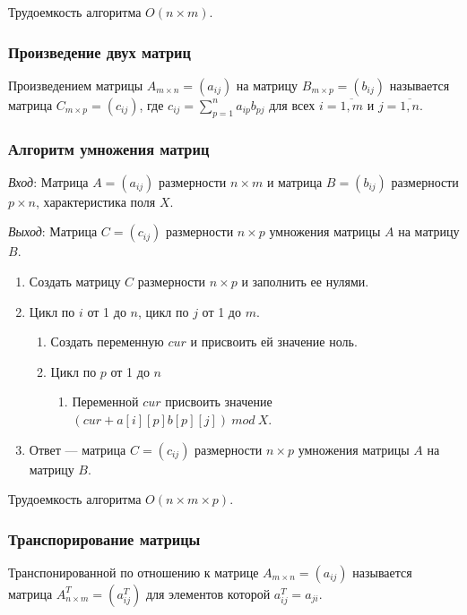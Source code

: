 \documentclass[bachelor, och, labwork]{shiza}
\begin{document}
Трудоемкость алгоритма $O(n \times m)$.

\subsubsection{Произведение двух матриц}

Произведением матрицы $A_{m\times n}=(a_{ij})$ на матрицу $B_{m\times p}=(b_{ij})$
называется матрица $C_{m\times p}=(c_{ij})$, где $c_{ij}=\sum_{p = 1}^{n}a_{ip}b_{pj}$
для всех $i=\overline{1,m}$ и $j= \overline{1,n}$.

\subsubsection{Алгоритм умножения матриц}

\textit{Вход}: Матрица $A=(a_{ij})$ размерности $n\times m$ и
матрица $B=(b_{ij})$ размерности $p\times n$, характеристика поля $X$.

\textit{Выход}: Матрица $C=(c_{ij})$ размерности $n\times p$ умножения
матрицы $A$ на матрицу $B$.

\begin{enumerate}
    \item Создать матрицу $C$ размерности $n\times p$ и заполнить ее нулями.
    \item Цикл по $i$ от 1 до $n$, цикл по $j$ от 1 до $m$.
    \begin{enumerate}
        \item Создать переменную $cur$ и присвоить ей значение ноль.
        \item Цикл по $p$ от 1 до $n$
        \begin{enumerate}
            \item Переменной $cur$ присвоить значение $(cur + a[i][p]b[p][j]) ~mod~ X$.
        \end{enumerate}
    \end{enumerate}

    \item Ответ --- матрица $C=(c_{ij})$ размерности $n\times p$ умножения матрицы   
    $A$ на матрицу $B$.
\end{enumerate}

Трудоемкость алгоритма $O(n \times m \times p)$.

\subsubsection{Транспорирование матрицы}
Транспонированной по отношению к матрице $A_{m\times n}=(a_{ij})$ называется матрица
$A^T_{n\times m}=(a^T_{ij})$ для элементов которой $a^T_{ij}=a_{ji}.$
\end{document}
